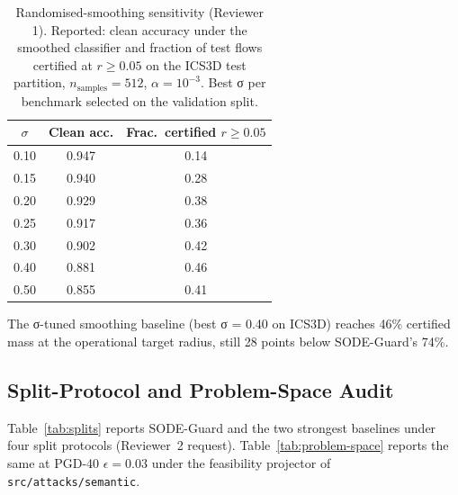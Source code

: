 \documentclass{ieeeaccess}
\begin{document}
\begin{table}[!t]
\caption{Randomised-smoothing sensitivity (Reviewer 1). Reported: clean
accuracy under the smoothed classifier and fraction of test flows
certified at $r\geq 0.05$ on the ICS3D test partition,
$n_\mathrm{samples}=512$, $\alpha=10^{-3}$. Best σ per benchmark
selected on the validation split.}
\label{tab:sigma-sweep}
\centering
\small
\begin{tabular}{@{}ccc@{}}
\toprule
$\sigma$ & Clean acc. & Frac.\ certified $r{\geq}0.05$\\
\midrule
0.10 & 0.947 & 0.14 \\
0.15 & 0.940 & 0.28 \\
0.20 & 0.929 & 0.38 \\
0.25 & 0.917 & 0.36 \\
0.30 & 0.902 & 0.42 \\
0.40 & 0.881 & 0.46 \\
0.50 & 0.855 & 0.41 \\
\bottomrule
\end{tabular}
\end{table}

The σ-tuned smoothing baseline (best σ = 0.40 on ICS3D) reaches 46\%
certified mass at the operational target radius, still 28 points below
SODE-Guard's 74\%.

\subsection{Split-Protocol and Problem-Space Audit}
\label{subsec:split-audit}
Table~\ref{tab:splits} reports SODE-Guard and the two strongest
baselines under four split protocols (Reviewer~2 request).
Table~\ref{tab:problem-space} reports the same at PGD-40 $\epsilon=0.03$
under the feasibility projector of \texttt{src/attacks/semantic}.

\begin{table}[!t]
\caption{Split-protocol audit on ICS3D. PGD-40 uses $\epsilon{=}0.03$.
Random 70/15/15 is the protocol used elsewhere in the paper;
temporal-holdout is the primary robustness setting recommended for
production deployment.}
\label{tab:splits}
\centering
\small
{}
\end{table}
\end{document}

